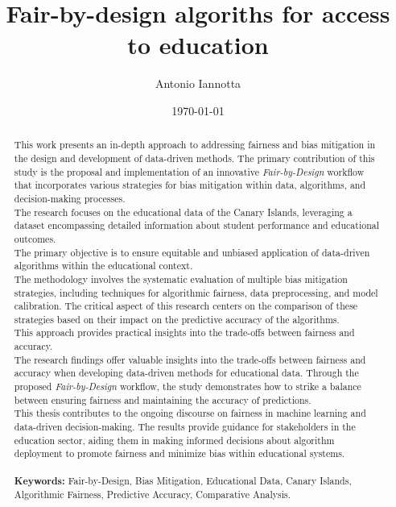 \documentclass[12pt,a4paper,openright,twoside]{book}
\title{Fair-by-design algoriths for access to education}
\author{Antonio Iannotta}
\date{\today}
\begin{document}
	
\frontmatter



\begin{abstract}

    This work presents an in-depth approach to addressing fairness and bias mitigation in the design and development of data-driven methods. The primary contribution of this study is the proposal and implementation of an innovative \emph{Fair-by-Design} workflow that incorporates various strategies for bias mitigation within data, algorithms, and decision-making processes. \\
    The research focuses on the educational data of the Canary Islands, leveraging a dataset encompassing detailed information about student performance and educational outcomes. \\
    The primary objective is to ensure equitable and unbiased application of data-driven algorithms within the educational context. \\
    The methodology involves the systematic evaluation of multiple bias mitigation strategies, including techniques for algorithmic fairness, data preprocessing, and model calibration. The critical aspect of this research centers on the comparison of these strategies based on their impact on the predictive accuracy of the algorithms. \\ 
    This approach provides practical insights into the trade-offs between fairness and accuracy. \\
    The research findings offer valuable insights into the trade-offs between fairness and accuracy when developing data-driven methods for educational data. Through the proposed \emph{Fair-by-Design} workflow, the study demonstrates how to strike a balance between ensuring fairness and maintaining the accuracy of predictions. \\
    This thesis contributes to the ongoing discourse on fairness in machine learning and data-driven decision-making. The results provide guidance for stakeholders in the education sector, aiding them in making informed decisions about algorithm deployment to promote fairness and minimize bias within educational systems. \\
    \\
    \textbf{Keywords:} Fair-by-Design, Bias Mitigation, Educational Data, Canary Islands, Algorithmic Fairness, Predictive Accuracy, Comparative Analysis.
    
    \end{abstract}
    
\end{document}

